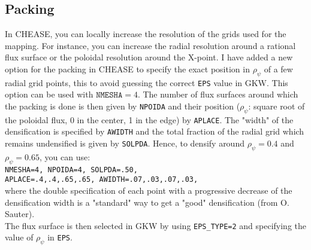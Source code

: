 \documentclass[a4paper,12pt]{article}
\begin{document}
\subsection{Packing}
In CHEASE, you can locally increase the resolution of the grids used for the mapping. For instance, you can increase the radial resolution around a rational flux surface or the poloidal resolution
around the X-point. I have added a new option for the packing in CHEASE to specify the exact position in $\rho_\psi$ of a few radial grid points, this to avoid guessing the
correct \texttt{EPS}
value in GKW. This option can be used with $\texttt{NMESHA}=4$. The number of flux surfaces around which the packing is done is then given by \texttt{NPOIDA} and their position ($\rho_\psi$: square
root of the poloidal flux, 0 in the center, 1 in the edge) by \texttt{APLACE}. The "width" of the densification is specified by \texttt{AWIDTH} and the total fraction of the radial grid which remains
undensified is given by \texttt{SOLPDA}. Hence, to densify around $\rho_\psi=0.4$ and $\rho_\psi=0.65$, you can use:\\
\texttt{\small NMESHA=4, NPOIDA=4, SOLPDA=.50,}\\
\texttt{\small APLACE=.4,.4,.65,.65, AWIDTH=.07,.03,.07,.03,}\\
where the double specification of each point with a progressive decrease of the densification width is a "standard" way to get a "good" densification (from O. Sauter).\\
The flux surface is then selected in GKW by using \texttt{EPS\_TYPE=2} and specifying the value of $\rho_\psi$ in \texttt{EPS}.
\end{document}
